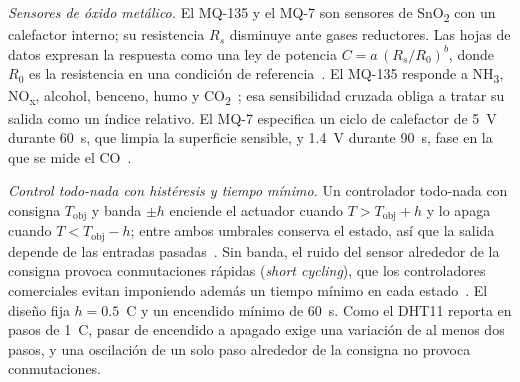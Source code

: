 \documentclass[manuscript,screen,nonacm,natbib=false]{acmart}
\newcommand{\gradC}{\textdegree{}C}
\newcommand{\COdos}{CO\textsubscript{2}}
\begin{document}
\textit{Sensores de óxido metálico.} El MQ-135 y el MQ-7 son sensores de SnO\textsubscript{2} con un calefactor interno; su resistencia $R_s$ disminuye ante gases reductores. Las hojas de datos expresan la respuesta como una ley de potencia $C = a\,(R_s/R_0)^{b}$, donde $R_0$ es la resistencia en una condición de referencia~\cite{hanwei2008mq135,hanwei2007mq7}. El MQ-135 responde a NH\textsubscript{3}, NO\textsubscript{x}, alcohol, benceno, humo y \COdos{}~\cite{hanwei2008mq135}; esa sensibilidad cruzada obliga a tratar su salida como un índice relativo. El MQ-7 especifica un ciclo de calefactor de 5~V durante 60~s, que limpia la superficie sensible, y 1.4~V durante 90~s, fase en la que se mide el CO~\cite{hanwei2007mq7}.

\textit{Control todo-nada con histéresis y tiempo mínimo.} Un controlador todo-nada con consigna $T_{\mathrm{obj}}$ y banda $\pm h$ enciende el actuador cuando $T > T_{\mathrm{obj}} + h$ y lo apaga cuando $T < T_{\mathrm{obj}} - h$; entre ambos umbrales conserva el estado, así que la salida depende de las entradas pasadas~\cite{astrom2021feedback}. Sin banda, el ruido del sensor alrededor de la consigna provoca conmutaciones rápidas (\textit{short cycling}), que los controladores comerciales evitan imponiendo además un tiempo mínimo en cada estado~\cite{shafrir1982controller}. El diseño fija $h = 0.5$~\gradC{} y un encendido mínimo de 60~s. Como el DHT11 reporta en pasos de 1~\gradC{}, pasar de encendido a apagado exige una variación de al menos dos pasos, y una oscilación de un solo paso alrededor de la consigna no provoca conmutaciones.
\end{document}

